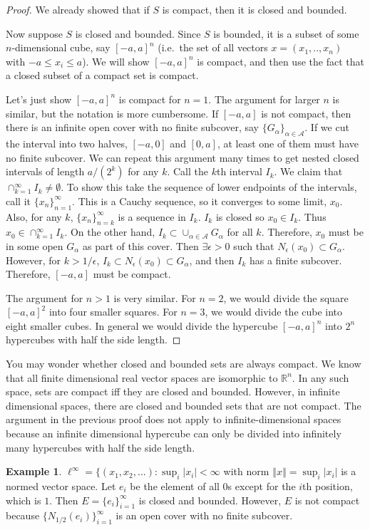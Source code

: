 \documentclass[12pt,reqno]{amsart}
\theoremstyle{definition}
\newtheorem{example}{Example}[section]
\def\R{\mathbb{R}}
\newcommand{\norm}[1]{\left\Vert {#1} \right\Vert}
\newcommand{\seq}[1]{\{{#1}_n \}_{n=1}^\infty }
\begin{document}
\begin{proof}
  We already showed that if $S$ is compact, then it is closed and
  bounded. 

  Now suppose $S$ is closed and bounded. Since $S$ is bounded, it is a
  subset of some $n$-dimensional cube, say $[-a,a]^n$ (i.e.\ the set
  of all vectors $x = (x_1,..,x_n)$ with $-a \leq x_i \leq a$).  We
  will show $[-a,a]^n$ is compact, and then use the fact that a
  closed subset of a compact set is compact.

  Let's just show $[-a,a]^n$ is compact for $n=1$. The argument for
  larger $n$ is similar, but the notation is more cumbersome. If
  $[-a,a]$ is not compact, then there is an infinite open cover with
  no finite subcover, say $\{G_\alpha\}_{\alpha \in \mathcal{A}}$. If
  we cut the interval into two halves, $[-a,0]$ and $[0,a]$, at least
  one of them must have no finite subcover. We can repeat this
  argument many times to get nested closed intervals of length
  $a/(2^k)$ for any $k$. Call the $k$th interval $I_k$. We claim that
  $\cap_{k=1}^\infty I_k \neq \emptyset$. To show this take the
  sequence of lower endpoints of the intervals, call it
  $\seq{x}$. This is a Cauchy sequence, so it converges to some limit,
  $x_0$. Also, for any $k$, $\{x_n\}_{n=k}^\infty$ is a sequence in
  $I_k$. $I_k$ is closed so $x_0 \in I_k$. Thus $x_0 \in
  \cap_{k=1}^\infty I_k$. On the other hand, $I_k \subset \cup_{\alpha
    \in \mathcal{A}} G_\alpha$ for all $k$. Therefore, $x_0$ must be
  in some open $G_\alpha$ as part of this cover. Then $\exists
  \epsilon>0$ such that $N_\epsilon(x_0) \subset G_\alpha$. However,
  for $k>1/\epsilon$, $I_k \subset N_\epsilon(x_0) \subset G_\alpha$,
  and then $I_k$ has a finite subcover. Therefore, $[-a,a]$ must be
  compact. 

  The argument for $n>1$ is very similar. For $n=2$, we would divide
  the square $[-a,a]^2$ into four smaller squares. For $n=3$, we would
  divide the cube into eight smaller cubes. In general we would divide
  the hypercube $[-a,a]^n$ into $2^n$ hypercubes with half the side
  length.
\end{proof}
You may wonder whether closed and bounded sets are always compact. We
know that all finite dimensional real vector spaces are isomorphic to
$\R^n$. In any such space, sets are compact iff they are closed and
bounded. However, in infinite dimensional spaces, there are closed and
bounded sets that are not compact. The argument in the previous proof
does not apply to infinite-dimensional spaces because an infinite
dimensional hypercube can only be divided into infinitely many
hypercubes with half the side length. 
\begin{example}
  $\ell^\infty = \{ (x_1, x_2, ...) : \sup_{i} |x_i| < \infty$ with
  norm $\norm{x} = \sup_{i} |x_i|$ is a normed vector space. Let $e_i$
  be the element of all $0$s except for the $i$th position, which is
  $1$. Then $E = \{e_i\}_{i=1}^\infty$ is closed and bounded. However,
  $E$ is not compact because $\{N_{1/2}(e_i)\}_{i=1}^\infty$ is an
  open cover with no finite subcover. 
\end{example}
\end{document}
